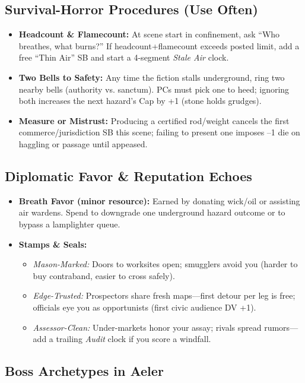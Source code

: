 \subsection*{Survival-Horror Procedures (Use Often)}
\begin{itemize}
  \item \textbf{Headcount \& Flamecount:} At scene start in confinement, ask “Who breathes, what burns?” If headcount+flamecount exceeds posted limit, add a free “Thin Air” SB and start a 4-segment \emph{Stale Air} clock.
  \item \textbf{Two Bells to Safety:} Any time the fiction stalls underground, ring two nearby bells (authority vs. sanctum). PCs must pick one to heed; ignoring both increases the next hazard’s Cap by +1 (stone holds grudges).
  \item \textbf{Measure or Mistrust:} Producing a certified rod/weight cancels the first commerce/jurisdiction SB this scene; failing to present one imposes --1 die on haggling or passage until appeased.
\end{itemize}

\subsection*{Diplomatic Favor \& Reputation Echoes}
\begin{itemize}
  \item \textbf{Breath Favor (minor resource):} Earned by donating wick/oil or assisting air wardens. Spend to downgrade one underground hazard outcome or to bypass a lamplighter queue.
  \item \textbf{Stamps \& Seals:}
    \begin{itemize}
      \item \emph{Mason-Marked:} Doors to worksites open; smugglers avoid you (harder to buy contraband, easier to cross safely).
      \item \emph{Edge-Trusted:} Prospectors share fresh maps—first detour per leg is free; officials eye you as opportunists (first civic audience DV +1).
      \item \emph{Assessor-Clean:} Under-markets honor your assay; rivals spread rumors—add a trailing \emph{Audit} clock if you score a windfall.
    \end{itemize}
\end{itemize}

\subsection*{Boss Archetypes in Aeler}
\label{sec:aeler-bosses}


